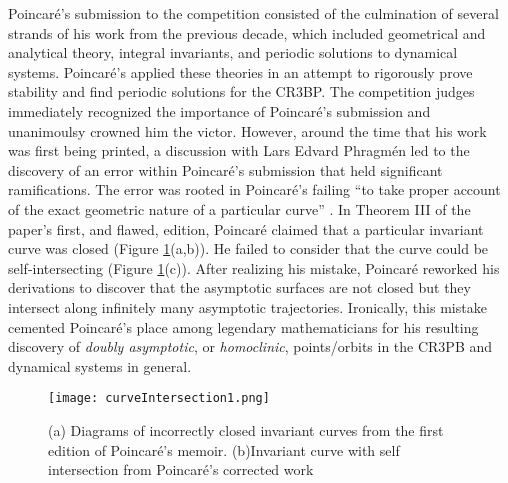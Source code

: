 \documentclass[11pt]{article} %
\begin{document}
Poincaré's submission to the competition consisted of the culmination of several strands of his work from the previous decade, which included geometrical and analytical theory, integral invariants, and periodic solutions to dynamical systems. Poincaré's applied these theories in an attempt to rigorously prove stability and find periodic solutions for the CR3BP. The competition judges immediately recognized the importance of Poincaré's submission and unanimoulsy crowned him the victor. However, around the time that his work was first being printed, a discussion with Lars Edvard Phragmén led to the discovery of an error within Poincaré's submission that held significant ramifications. The error was rooted in Poincaré's failing ``to take proper account of the exact geometric nature of a particular curve'' \cite{BarrowGreen1997}. In Theorem III of the paper's first, and flawed, edition, Poincaré claimed that a particular invariant curve was closed (Figure \ref{fig:curveIntersection1}(a,b)). He failed to consider that the curve could be self-intersecting (Figure \ref{fig:curveIntersection1}(c)). After realizing his mistake, Poincaré reworked his derivations to discover that the asymptotic surfaces are not closed but they intersect along infinitely many asymptotic trajectories. Ironically, this mistake cemented Poincaré's place among legendary mathematicians for his resulting discovery of \textit{doubly asymptotic}, or \textit{homoclinic}, points/orbits in the CR3PB and dynamical systems in general.  

\begin{figure}[H]
\centering
\texttt{[image: curveIntersection1.png]}\nonumber
\caption{(a) Diagrams of incorrectly closed invariant curves from the first edition of Poincaré's memoir. (b)Invariant curve with self intersection from Poincaré's corrected work \cite{BarrowGreen1997}}
\label{fig:curveIntersection1}
\end{figure}

\end{document}
